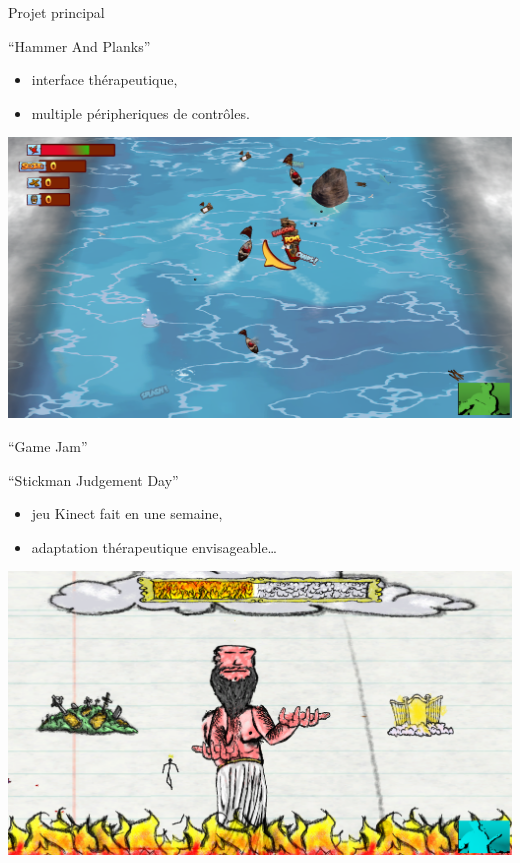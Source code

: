 \begin{frame}{Projet principal}
\begin{block}{``Hammer And Planks''}
\begin{itemize}
\item interface thérapeutique,
\item multiple péripheriques de contrôles.
\end{itemize}
\end{block}
  \begin{center}
    \includegraphics[height=0.5\textheight]{../images/hnp}
  \end{center}
  \vfill

\end{frame}

\begin{frame}{``Game Jam''}
\begin{block}{``Stickman Judgement Day''}
\begin{itemize}
\item jeu Kinect fait en une semaine,
\item adaptation thérapeutique envisageable\ldots
\end{itemize}
\end{block}

  \begin{center}
    \includegraphics[height=0.5\textheight]{../images/leminect}
  \end{center}
  \vfill

\end{frame}